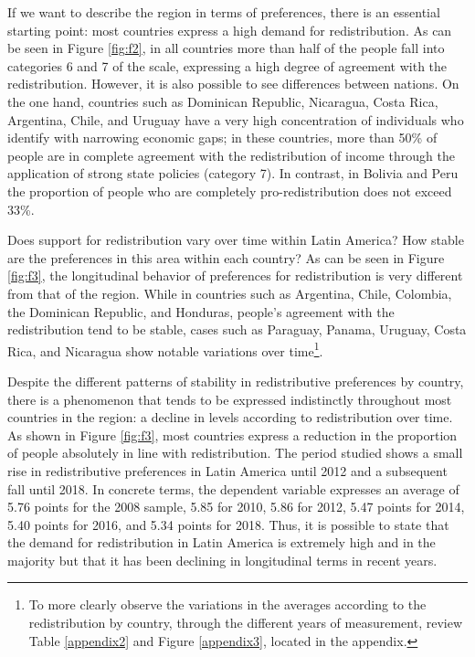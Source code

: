 \documentclass[utf8]{frontiersSCNS} %
\begin{document}
If we want to describe the region in terms of preferences, there is an essential starting point: most countries express a high demand for redistribution. As can be seen in Figure \ref{fig:f2}, in all countries more than half of the people fall into categories 6 and 7 of the scale, expressing a high degree of agreement with the redistribution. However, it is also possible to see differences between nations. On the one hand, countries such as Dominican Republic, Nicaragua, Costa Rica, Argentina, Chile, and Uruguay have a very high concentration of individuals who identify with narrowing economic gaps; in these countries, more than 50\% of people are in complete agreement with the redistribution of income through the application of strong state policies (category 7). In contrast, in Bolivia and Peru the proportion of people who are completely pro-redistribution does not exceed 33\%.

Does support for redistribution vary over time within Latin America? How stable are the preferences in this area within each country? As can be seen in Figure \ref{fig:f3}, the longitudinal behavior of preferences for redistribution is very different from that of the region. While in countries such as Argentina, Chile, Colombia, the Dominican Republic, and Honduras, people’s agreement with the redistribution tend to be stable, cases such as Paraguay, Panama, Uruguay, Costa Rica, and Nicaragua show notable variations over time\footnote{To more clearly observe the variations in the averages according to the redistribution by country, through the different years of measurement, review Table \ref{appendix2} and Figure \ref{appendix3}, located in the appendix.}.

Despite the different patterns of stability in redistributive preferences by country, there is a phenomenon that tends to be expressed indistinctly throughout most countries in the region: a decline in levels according to redistribution over time. As shown in Figure \ref{fig:f3}, most countries express a reduction in the proportion of people absolutely in line with redistribution. The period studied shows a small rise in redistributive preferences in Latin America until 2012 and a subsequent fall until 2018. In concrete terms, the dependent variable expresses an average of 5.76 points for the 2008 sample, 5.85 for 2010, 5.86 for 2012, 5.47 points for 2014, 5.40 points for 2016, and 5.34 points for 2018. Thus, it is possible to state that the demand for redistribution in Latin America is extremely high and in the majority but that it has been declining in longitudinal terms in recent years.
\end{document}
